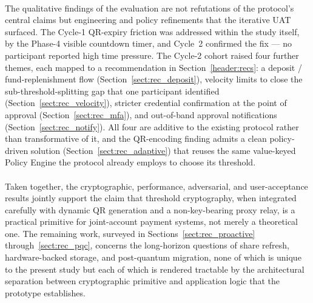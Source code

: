 \paragraph{}The qualitative findings of the evaluation are not refutations of the protocol's central claims but engineering and policy refinements that the iterative UAT surfaced. The Cycle-1 QR-expiry friction was addressed within the study itself, by the Phase-4 visible countdown timer, and Cycle~2 confirmed the fix --- no participant reported high time pressure. The Cycle-2 cohort raised four further themes, each mapped to a recommendation in Section~\ref{header:recs}: a deposit / fund-replenishment flow (Section~\ref{sect:rec_deposit}), velocity limits to close the sub-threshold-splitting gap that one participant identified (Section~\ref{sect:rec_velocity}), stricter credential confirmation at the point of approval (Section~\ref{sect:rec_mfa}), and out-of-band approval notifications (Section~\ref{sect:rec_notify}). All four are additive to the existing protocol rather than transformative of it, and the QR-encoding finding admits a clean policy-driven solution (Section~\ref{sect:rec_adaptive}) that reuses the same value-keyed Policy Engine the protocol already employs to choose its threshold.

\paragraph{}Taken together, the cryptographic, performance, adversarial, and user-acceptance results jointly support the claim that threshold cryptography, when integrated carefully with dynamic QR generation and a non-key-bearing proxy relay, is a practical primitive for joint-account payment systems, not merely a theoretical one. The remaining work, surveyed in Sections~\ref{sect:rec_proactive} through~\ref{sect:rec_pqc}, concerns the long-horizon questions of share refresh, hardware-backed storage, and post-quantum migration, none of which is unique to the present study but each of which is rendered tractable by the architectural separation between cryptographic primitive and application logic that the prototype establishes.

